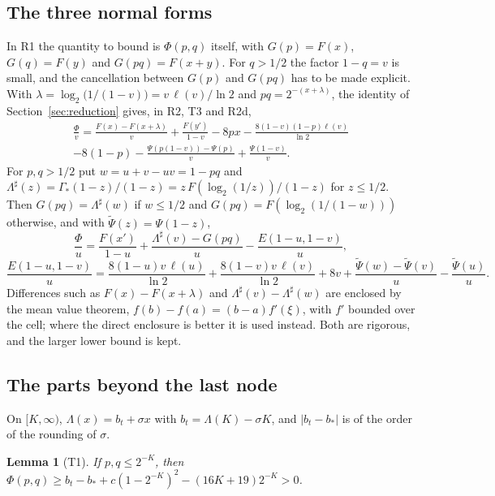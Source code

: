\documentclass[11pt]{amsart}
\newtheorem{lemma}[theorem]{Lemma}
\theoremstyle{remark}
\begin{document}
\subsection*{The three normal forms}
In R1 the quantity to bound is $\Phi(p,q)$ itself, with $G(p)=F(x)$, $G(q)=F(y)$ and $G(pq)=F(x+y)$. For $q>1/2$ the factor $1-q=v$ is small, and the cancellation between $G(p)$ and $G(pq)$ has to be made explicit. With $\lambda=\log_2\bigl(1/(1-v)\bigr)=v\,\ell(v)/\ln2$ and $pq=2^{-(x+\lambda)}$, the identity of Section~\ref{sec:reduction} gives, in R2, T3 and R2d,
\begin{multline*}
\frac{\Phi}{v}=\frac{F(x)-F(x+\lambda)}{v}+\frac{F(y')}{1-v}-8px-\frac{8(1-v)(1-p)\ell(v)}{\ln2}\\
-8(1-p)-\frac{\Psi(p(1-v))-\Psi(p)}{v}+\frac{\Psi(1-v)}{v}.
\end{multline*}
For $p,q>1/2$ put $w=u+v-uv=1-pq$ and $\Lambda^\sharp(z)=\Gamma_*(1-z)/(1-z)=z\,F(\log_2(1/z))/(1-z)$ for $z\le1/2$. Then $G(pq)=\Lambda^\sharp(w)$ if $w\le1/2$ and $G(pq)=F(\log_2(1/(1-w)))$ otherwise, and with $\widetilde\Psi(z)=\Psi(1-z)$,
\[
\frac{\Phi}{u}=\frac{F(x')}{1-u}+\frac{\Lambda^\sharp(v)-G(pq)}{u}-\frac{E(1-u,1-v)}{u},
\]
\[
\frac{E(1-u,1-v)}{u}=\frac{8(1-u)v\,\ell(u)}{\ln2}+\frac{8(1-v)v\,\ell(v)}{\ln2}+8v+\frac{\widetilde\Psi(w)-\widetilde\Psi(v)}{u}-\frac{\widetilde\Psi(u)}{u}.
\]
Differences such as $F(x)-F(x+\lambda)$ and $\Lambda^\sharp(v)-\Lambda^\sharp(w)$ are enclosed by the mean value theorem, $f(b)-f(a)=(b-a)f'(\xi)$, with $f'$ bounded over the cell; where the direct enclosure is better it is used instead. Both are rigorous, and the larger lower bound is kept.

\subsection*{The parts beyond the last node}
On $[K,\infty)$, $\Lambda(x)=b_t+\sigma x$ with $b_t=\Lambda(K)-\sigma K$, and $|b_t-b_*|$ is of the order of the rounding of $\sigma$.

\begin{lemma}[T1]\label{lem:T1}
If $p,q\le2^{-K}$, then $\Phi(p,q)\ge b_t-b_*+c(1-2^{-K})^2-(16K+19)2^{-K}>0$.
\end{lemma}
\end{document}
